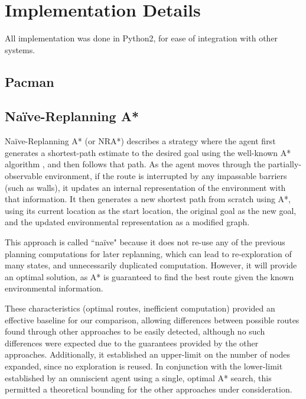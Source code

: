 
\section{Implementation Details}\label{sec:implementation}

	All implementation was done in Python2, for ease of integration with other systems. 

\subsection{Pacman}


\subsection{Naïve-Replanning A*}

	Naïve-Replanning A* (or NRA*) describes a strategy where the agent first generates a shortest-path estimate to the desired goal using the well-known A* algorithm \cite{hart1968formal}, and then follows that path. As the agent moves through the partially-observable environment, if the route is interrupted by any impassable barriers (such as walls), it updates an internal representation of the environment with that information. It then generates a new shortest path from scratch using A*, using its current location as the start location, the original goal as the new goal, and the updated environmental representation as a modified graph.
	
	This approach is called ``naïve" because it does not re-use any of the previous planning computations for later replanning, which can lead to re-exploration of many states, and unnecessarily duplicated computation. However, it will provide an optimal solution, as A* is guaranteed to find the best route given the known environmental information.
	
	These characteristics (optimal routes, inefficient computation) provided an effective baseline for our comparison, allowing differences between possible routes found through other approaches to be easily detected, although no such differences were expected due to the guarantees provided by the other approaches. Additionally, it established an upper-limit on the number of nodes expanded, since no exploration is reused. In conjunction with the lower-limit established by an omniscient agent using a single, optimal A* search, this permitted a theoretical bounding for the other approaches under consideration.


